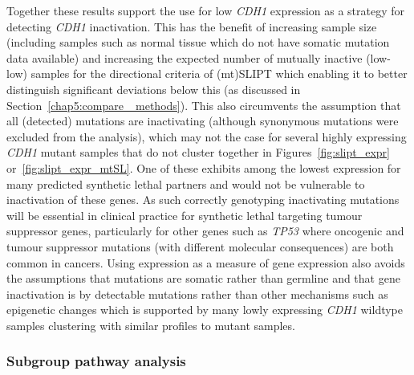 Together these results support the use for low \textit{CDH1} expression as a strategy for detecting \textit{CDH1} inactivation. This has the benefit of increasing sample size (including samples such as normal tissue which do not have somatic mutation data available) and increasing the expected number of mutually inactive (low-low) samples for the directional criteria of (mt)SLIPT which enabling it to better distinguish significant deviations below this (as discussed in Section~\ref{chap5:compare_ methods}). This also circumvents the assumption that all (detected) mutations are inactivating (although synonymous mutations were excluded from the analysis), which may not the case for several highly expressing \textit{CDH1} mutant samples that do not cluster together in Figures~\ref{fig:slipt_expr} or~\ref{fig:slipt_expr_mtSL}. One of these exhibits among the lowest expression for many predicted synthetic lethal partners and would not be vulnerable to inactivation of these genes. As such correctly genotyping inactivating mutations will be essential in clinical practice for synthetic lethal targeting tumour suppressor genes, particularly for other genes such as \textit{TP53} where oncogenic and tumour suppressor mutations (with different molecular consequences) are both common in cancers. Using expression as a measure of gene expression also avoids the assumptions that mutations are somatic rather than germline and that gene inactivation is by detectable mutations rather than other mechanisms such as epigenetic changes which is supported by many lowly expressing \textit{CDH1} wildtype samples clustering with similar profiles to mutant samples.



\FloatBarrier

\subsubsection{Subgroup pathway analysis}



